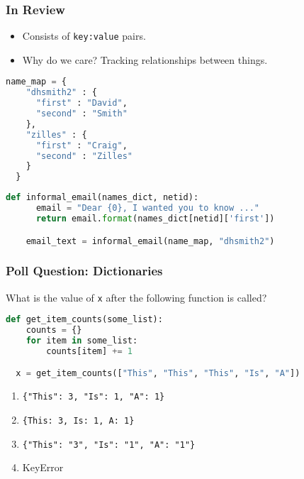 \documentclass{beamer}
\begin{document}
%
%
\begin{frame}[fragile]
  \frametitle{In Review} 
  \vfill
  \begin{minipage}{0.60\textwidth}
    \begin{itemize}
      \item Consists of \lstinline|key:value| pairs.
      \item Why do we care? Tracking relationships between things. 
    \end{itemize}
  \end{minipage}
  \begin{minipage}{0.39\textwidth} 
    \begin{lstlisting}[language=Python, autogobble]
  name_map = {
    "dhsmith2" : {
      "first" : "David",
      "second" : "Smith"
    },
    "zilles" : {
      "first" : "Craig",
      "second" : "Zilles"
    }
  }\end{lstlisting}
  \end{minipage}
  \vfill
  \begin{lstlisting}[language=Python, autogobble]
    def informal_email(names_dict, netid):
      email = "Dear {0}, I wanted you to know ..."
      return email.format(names_dict[netid]['first'])

    email_text = informal_email(name_map, "dhsmith2")
  \end{lstlisting}
\end{frame}

%
%
\begin{frame}[fragile]
  \frametitle{Poll Question: Dictionaries}
  What is the value of \lstinline|x| after the following function is called?
  \begin{lstlisting}[language=Python, autogobble]
  def get_item_counts(some_list):
    counts = {}
    for item in some_list:
        counts[item] += 1

  x = get_item_counts(["This", "This", "This", "Is", "A"])
  \end{lstlisting}
  \vfill
  \begin{enumerate}
    \item \lstinline|{"This": 3, "Is": 1, "A": 1}|
    \item \lstinline|{This: 3, Is: 1, A: 1}|
    \item \lstinline|{"This": "3", "Is": "1", "A": "1"}|
    \item KeyError
  \end{enumerate}
\end{frame}
\end{document}
